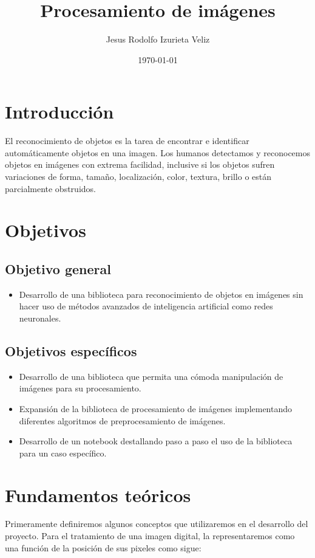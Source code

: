 \documentclass[letter]{article}
\author{Jesus Rodolfo Izurieta Veliz}
\date{\today}
\title{Procesamiento de imágenes}
\begin{document}
\maketitle

\section{Introducción}
\label{sec:org12d93c6}
El reconocimiento de objetos es la tarea de encontrar e identificar
automáticamente objetos en una imagen. Los humanos detectamos y reconocemos
objetos en imágenes con extrema facilidad, inclusive si los objetos sufren
variaciones de forma, tamaño, localización, color, textura, brillo o están
parcialmente obstruidos.

\section{Objetivos}
\label{sec:org52553eb}
\subsection{Objetivo general}
\label{sec:org4b6811f}
\begin{itemize}
\item Desarrollo de una biblioteca para reconocimiento de objetos en imágenes sin
hacer uso de métodos avanzados de inteligencia artificial como redes
neuronales.
\end{itemize}

\subsection{Objetivos específicos}
\label{sec:orge669229}
\begin{itemize}
\item Desarrollo de una biblioteca que permita una cómoda manipulación de imágenes
para su procesamiento.
\item Expansión de la biblioteca de procesamiento de imágenes implementando
diferentes algoritmos de preprocesamiento de imágenes.
\item Desarrollo de un notebook destallando paso a paso el uso de la biblioteca para
un caso específico.
\end{itemize}

\section{Fundamentos teóricos}
\label{sec:org3a94746}
Primeramente definiremos algunos conceptos que utilizaremos en el desarrollo del
proyecto. Para el tratamiento de una imagen digital, la representaremos como una
función de la posición de sus pixeles como sigue:
\end{document}
